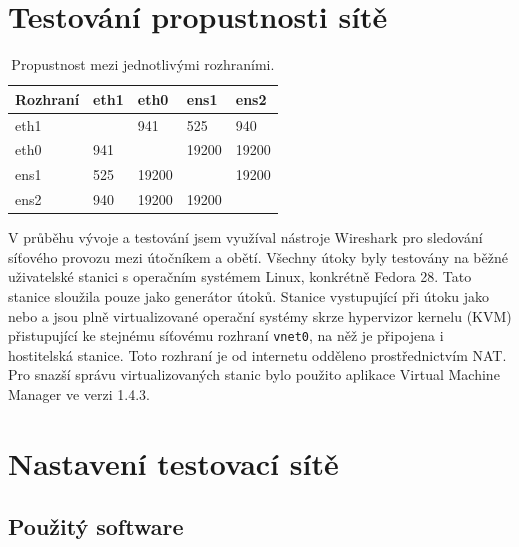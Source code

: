 \section{Testování propustnosti sítě}

\begin{table}[ht]
	\centering
	\caption{Propustnost mezi jednotlivými rozhraními.}
	\label{tab:troughput-lab-interfaces}
	\begin{tabular}{|l|l|l|l|l|}
		\hline
		Rozhraní & eth1 & eth0  & ens1  & ens2  \\ \hline
		eth1     &      & 941   & 525   & 940   \\ \hline
		eth0     & 941  &       & 19200 & 19200 \\ \hline
		ens1     & 525  & 19200 &       & 19200 \\ \hline
		ens2     & 940  & 19200 & 19200 &       \\ \hline
	\end{tabular}
\end{table}

V průběhu vývoje a testování jsem využíval nástroje Wireshark pro sledování síťového provozu mezi útočníkem a obětí. Všechny útoky byly testovány na běžné uživatelské stanici s operačním systémem Linux, konkrétně Fedora 28. Tato stanice sloužila pouze jako generátor útoků. Stanice vystupující při útoku jako  nebo  a  jsou plně virtualizované operační systémy skrze hypervizor kernelu (KVM) přistupující ke stejnému síťovému rozhraní \texttt{vnet0}, na něž je připojena i hostitelská stanice. Toto rozhraní je od internetu odděleno prostřednictvím NAT. Pro snazší správu virtualizovaných stanic bylo použito aplikace Virtual Machine Manager ve verzi 1.4.3.

\section{Nastavení testovací sítě}
%
%
%
%



\subsection{Použitý software} %


